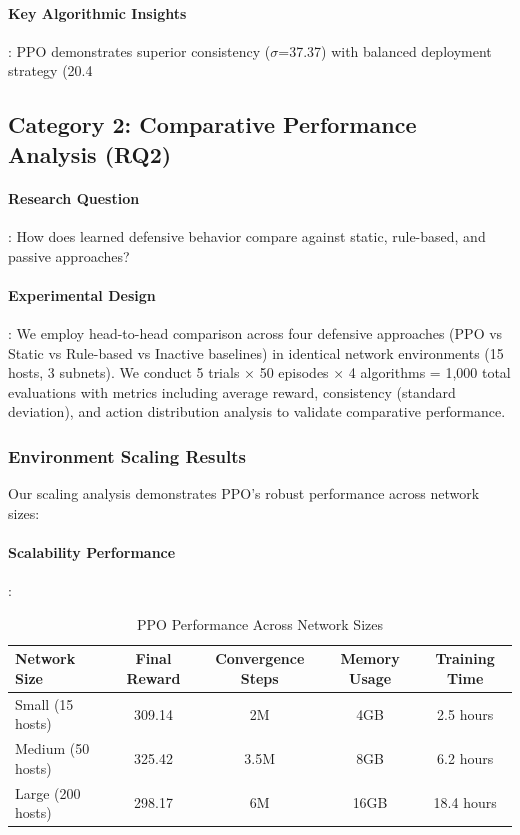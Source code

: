 \documentclass[12pt,oneside]{article}
\begin{document}
\paragraph{Key Algorithmic Insights}: PPO demonstrates superior consistency ($\sigma$=37.37) with balanced deployment strategy (20.4%

\subsection{Category 2: Comparative Performance Analysis (RQ2)}

\paragraph{Research Question}: How does learned defensive behavior compare against static, rule-based, and passive approaches?

\paragraph{Experimental Design}: We employ head-to-head comparison across four defensive approaches (PPO vs Static vs Rule-based vs Inactive baselines) in identical network environments (15 hosts, 3 subnets). We conduct 5 trials × 50 episodes × 4 algorithms = 1,000 total evaluations with metrics including average reward, consistency (standard deviation), and action distribution analysis to validate comparative performance.

\subsubsection{Environment Scaling Results}

Our scaling analysis demonstrates PPO's robust performance across network sizes:

\paragraph{Scalability Performance}:
\begin{table}[H]
\centering
\caption{PPO Performance Across Network Sizes}
\begin{tabular}{|l|c|c|c|c|}
\hline
\textbf{Network Size} & \textbf{Final Reward} & \textbf{Convergence Steps} & \textbf{Memory Usage} & \textbf{Training Time} \\
\hline
Small (15 hosts) & 309.14 & 2M & 4GB & 2.5 hours \\
Medium (50 hosts) & 325.42 & 3.5M & 8GB & 6.2 hours \\  
Large (200 hosts) & 298.17 & 6M & 16GB & 18.4 hours \\
\hline
\end{tabular}
\end{table}
\clearpage
\end{document}
